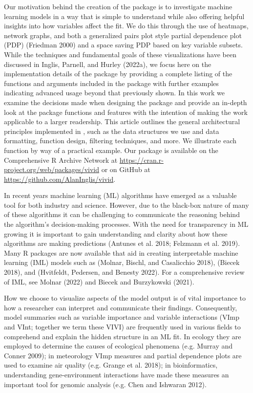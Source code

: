 Our motivation behind the creation of the  package is to investigate machine learning
models in a way that is simple to understand while also offering helpful
insights into how variables affect the fit. We do this through the use
of heatmaps, network graphs, and both a generalized pairs plot style
partial dependence plot (PDP) (Friedman 2000) and a space saving PDP based
on key variable subsets. While the techniques and fundamental goals of
these visualizations have been discussed in Inglis, Parnell, and Hurley (2022a), we
focus here on the implementation details of the package by providing a
complete listing of the functions and arguments included in the 
package with further examples indicating advanced usage beyond that
previously shown. In this work we examine the decisions made when
designing the package and provide an in-depth look at the package
functions and features with the intention of making the work applicable
to a larger readership. This article outlines the general architectural
principles implemented in , such as the data structures we use and data
formatting, function design, filtering techniques, and more. We
illustrate each function by way of a practical example. Our package is
available on the Comprehensive R Archive Network at
\url{https://cran.r-project.org/web/packages/vivid} or on GitHub at
\url{https://github.com/AlanInglis/vivid}.

In recent years machine learning (ML) algorithms have emerged as a
valuable tool for both industry and science. However, due to the
black-box nature of many of these algorithms it can be challenging to
communicate the reasoning behind the algorithm's decision-making
processes. With the need for transparency in ML growing it is important
to gain understanding and clarity about how these algorithms are making
predictions (Antunes et al. 2018; Felzmann et al. 2019). Many R
packages are now available that aid in creating interpretable machine
learning (IML) models such as  (Molnar, Bischl, and Casalicchio 2018),  (Biecek 2018), and
 (Hvitfeldt, Pedersen, and Benesty 2022). For a
comprehensive review of IML, see Molnar (2022) and
Biecek and Burzykowski (2021).

How we choose to visualize aspects of the model output is of vital
importance to how a researcher can interpret and communicate their
findings. Consequently, model summaries such as variable importance and
variable interactions (VImp and VInt; together we term these VIVI) are
frequently used in various fields to comprehend and explain the hidden
structure in an ML fit. In ecology they are employed to determine the
causes of ecological phenomena (e.g. Murray and Conner 2009); in meteorology
VImp measures and partial dependence plots are used to examine air
quality (e.g. Grange et al. 2018); in bioinformatics, understanding
gene-environment interactions have made these measures an important tool
for genomic analysis (e.g. Chen and Ishwaran 2012).

